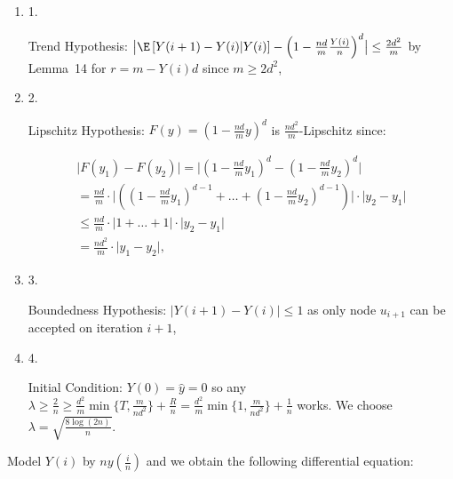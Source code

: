 \begin{enumerate}


\item[] 1. 


Trend Hypothesis: $\bigl|\E\left[Y(i+1)-Y(i)\middle|Y(i)\right]-\left(1-\frac{nd}{m}\frac{Y(i)}{n}\right)^{d}\bigr|\leq\frac{2d^{2}}{m}$ by Lemma 14 for $r=m-Y(i)d$ since $m\geq 2d^{2}$,\par




\item[] 2. 


Lipschitz Hypothesis: $F(y)=\left(1-\frac{nd}{m}y\right)^{d}$ is $\frac{nd^{2}}{m}$-Lipschitz since:\par


\[\begin{gathered}
\displaystyle\bigl|F(y_{1})-F(y_{2})\bigr| \displaystyle=\bigl|\left(1-\frac{nd}{m}y_{1}\right)^{d}-\left(1-\frac{nd}{m}y_{2}\right)^{d}\bigr| \\
\displaystyle=\frac{nd}{m}\cdot\bigl|\left(\left(1-\frac{nd}{m}y_{1}\right)^{d-1}+\dots+\left(1-\frac{nd}{m}y_{2}\right)^{d-1}\right)\bigr|\cdot\bigl|y_{2}-y_{1}\bigr| \\
\displaystyle\leq\frac{nd}{m}\cdot\bigl|1+\dots+1\bigr|\cdot\bigl|y_{2}-y_{1}\bigr| \\
\displaystyle=\frac{nd^{2}}{m}\cdot\bigl|y_{1}-y_{2}\bigr|,
\end{gathered}\]




\item[] 3. 


Boundedness Hypothesis: $\bigl|Y(i+1)-Y(i)\bigr|\leq 1$ as only node $u_{i+1}$ can be accepted on iteration $i+1$,\par




\item[] 4. 


Initial Condition: $Y(0)=\hat{y}=0$ so any $\lambda\geq\frac{2}{n}\geq\frac{d^{2}}{m}\min\{T,\frac{m}{nd^{2}}\}+\frac{R}{n}=\frac{d^{2}}{m}\min\{1,\frac{m}{nd^{2}}\}+\frac{1}{n}$ works. We choose $\lambda=\sqrt{\frac{8\log{(2n)}}{n}}$.\par




\end{enumerate}




Model $Y(i)$ by $ny\left(\frac{i}{n}\right)$ and we obtain the following differential equation:\par


